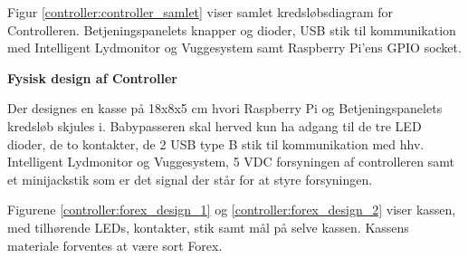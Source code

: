 Figur \ref{controller:controller_samlet} viser samlet kredsløbsdiagram for Controlleren. Betjeningspanelets knapper og dioder, USB stik til kommunikation med Intelligent Lydmonitor og Vuggesystem samt Raspberry Pi'ens GPIO socket.


\textbf{Fysisk design af Controller} \label{forex_controller}

Der designes en kasse på 18x8x5 cm hvori Raspberry Pi og Betjeningspanelets kredsløb skjules i. Babypasseren skal herved kun ha adgang til de tre LED dioder, de to kontakter, de 2 USB type B stik til kommunikation med hhv. Intelligent Lydmonitor og Vuggesystem, 5 VDC forsyningen af controlleren samt et minijackstik som er det signal der står for at styre forsyningen. 

Figurene \ref{controller:forex_design_1} og \ref{controller:forex_design_2} viser kassen, med tilhørende LEDs, kontakter, stik samt mål på selve kassen. Kassens materiale forventes at være sort Forex.  



